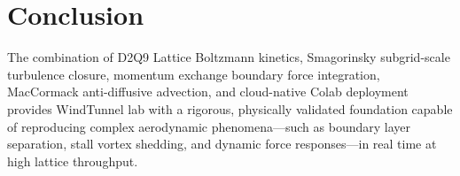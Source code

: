 \documentclass[11pt,a4paper]{article}
\begin{document}
\section{Conclusion}
The combination of D2Q9 Lattice Boltzmann kinetics, Smagorinsky subgrid-scale turbulence closure, momentum exchange boundary force integration, MacCormack anti-diffusive advection, and cloud-native Colab deployment provides WindTunnel lab with a rigorous, physically validated foundation capable of reproducing complex aerodynamic phenomena---such as boundary layer separation, stall vortex shedding, and dynamic force responses---in real time at high lattice throughput.
\end{document}
